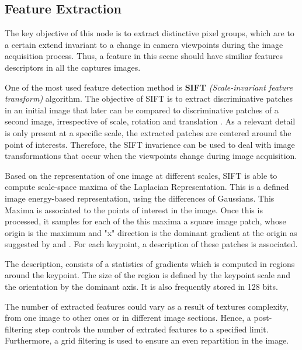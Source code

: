 \documentclass[12pt]{report}
\begin{document}
\subsection{Feature Extraction}
The key objective of this node is to extract distinctive pixel groups, which are to a certain extend invariant to a change in camera viewpoints during the image acquisition process.
Thus, a feature in this scene should have similiar features descriptors in all the captures images.

One of the most used feature detection method is \textbf{SIFT} \textit{(Scale-invariant feature transform)} algorithm. 
The objective of SIFT is to extract discriminative patches in an initial image that later can be compared to discriminative patches of a second image, irrespective of scale, rotation and translation .
As a relevant detail is only present at a specific scale, the extracted patches are centered around the point of interests. 
Therefore, the SIFT invarience can be used to deal with image transformations that occur when the viewpoints change during image acquisition.

Based on the representation of one image at different scales, SIFT is able to compute scale-space maxima of the Laplacian Representation. This is a defined image energy-based representation, using the differences of Gaussians.
This Maxima is associated to the points of interest in the image. 
Once this is processed, it samples for each of the this maxima a square image patch, whose origin is the maximum and "x" direction is the dominant gradient at the origin as suggested by  and .
For each keypoint, a description of these patches is associated. 

The description, consists of a statistics of gradients which is computed in regions around the keypoint. The size of the region is defined by the keypoint scale and the orientation by the dominant axis.
 It is also frequently stored in 128 bits.
 \enlargethispage{\baselineskip}

The number of extracted features could vary as a result of textures complexity, from one image to other ones or in different image sections. Hence, a post-filtering step controls the number of extrated features to a specified limit. 
Furthermore, a grid filtering is used to ensure an even repartition in the image.
\end{document}
